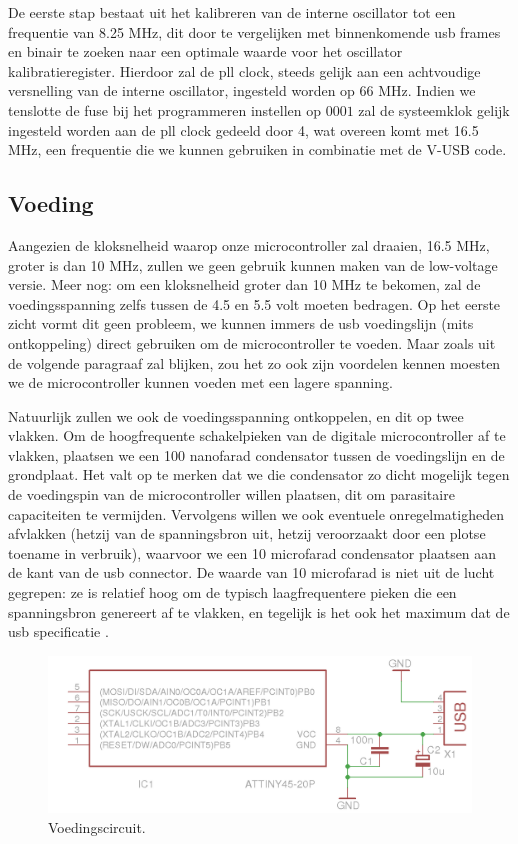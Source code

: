 De eerste stap bestaat uit het kalibreren van de interne oscillator tot een frequentie van 8.25 MHz, dit door te vergelijken met binnenkomende \ac{usb} frames en binair te zoeken naar een optimale waarde voor het  oscillator kalibratieregister. Hierdoor zal de \ac{pll} clock, steeds gelijk aan een achtvoudige versnelling van de interne oscillator, ingesteld worden op 66 MHz. Indien we tenslotte de  fuse bij het programmeren instellen op $0001$ zal de systeemklok gelijk ingesteld worden aan de \ac{pll} clock gedeeld door 4, wat overeen komt met 16.5 MHz, een frequentie die we kunnen gebruiken in combinatie met de V-USB code.

\subsection{Voeding}

Aangezien de kloksnelheid waarop onze microcontroller zal draaien, 16.5 MHz, groter is dan 10 MHz, zullen we geen gebruik kunnen maken van de low-voltage versie. Meer nog: om een kloksnelheid groter dan 10 MHz te bekomen, zal de voedingsspanning zelfs tussen de 4.5 en 5.5 volt moeten bedragen. Op het eerste zicht vormt dit geen probleem, we kunnen immers de \ac{usb} voedingslijn (mits ontkoppeling) direct gebruiken om de microcontroller te voeden. Maar zoals uit de volgende paragraaf zal blijken, zou het zo ook zijn voordelen kennen moesten we de microcontroller kunnen voeden met een lagere spanning.

Natuurlijk zullen we ook de voedingsspanning ontkoppelen, en dit op twee vlakken. Om de hoogfrequente schakelpieken van de digitale microcontroller af te vlakken, plaatsen we een 100 nanofarad condensator tussen de voedingslijn en de grondplaat. Het valt op te merken dat we die condensator zo dicht mogelijk tegen de voedingspin van de microcontroller willen plaatsen, dit om parasitaire capaciteiten te vermijden. Vervolgens willen we ook eventuele onregelmatigheden afvlakken (hetzij van de spanningsbron uit, hetzij veroorzaakt door een plotse toename in verbruik), waarvoor we een 10 microfarad condensator plaatsen aan de kant van de \ac{usb} connector. De waarde van 10 microfarad is niet uit de lucht gegrepen: ze is relatief hoog om de typisch laagfrequentere pieken die een spanningsbron genereert af te vlakken, en tegelijk is het ook het maximum dat de \ac{usb} specificatie .

\begin{figure}
	\includegraphics[width=\textwidth]{afbeeldingen/inputmodule_voeding}
	\caption{Voedingscircuit.}
\end{figure}

